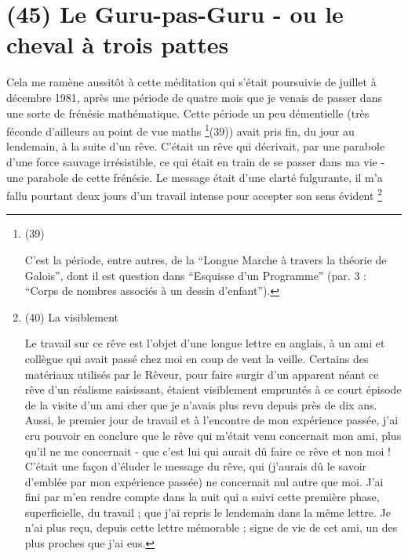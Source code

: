 \section{(45) Le Guru-pas-Guru - ou le cheval à trois pattes}

Cela me ramène aussitôt à cette méditation qui s'était poursuivie de juillet à décembre 1981, après une période de quatre mois que je venais de passer dans une sorte de frénésie mathématique. Cette période un peu démentielle (très féconde d'ailleurs au point de vue maths \footnote{(39) \par C'est la période, entre autres, de la ``Longue Marche à travers la théorie de Galois'', dont il est question dans ``Esquisse d'un Programme'' (par. 3 : ``Corps de nombres associés à un dessin d'enfant'').}(39)) avait pris fin, du jour au lendemain, à la suite d'un rêve. C'était un rêve qui décrivait, par une parabole d'une force sauvage irrésistible, ce qui était en train de se passer dans ma vie - une parabole de cette frénésie. Le message était d'une clarté fulgurante, il m'a fallu pourtant deux jours d'un travail intense pour accepter son sens évident \footnote{(40) La visiblement

Le travail sur ce rêve est l'objet d'une longue lettre en anglais, à un ami et collègue qui avait passé chez moi en coup de vent la veille. Certains des matériaux utilisés par le Rêveur, pour faire surgir d'un apparent néant ce rêve d'un réalisme saisissant, étaient visiblement empruntés à ce court épisode de la visite d'un ami cher que je n'avais plus revu depuis près de dix ans. Aussi, le premier jour de travail et à l'encontre de mon expérience passée, j'ai cru pouvoir en conclure que le rêve qui m'était venu concernait mon ami, plus qu'il ne me concernait - que c'est lui qui aurait dû faire ce rêve et non moi ! C'était une façon d'éluder le message du rêve, qui (j'aurais dû le savoir d'emblée par mon expérience passée) ne concernait nul autre que moi. J'ai fini par m'en rendre compte dans la nuit qui a suivi cette première phase, superficielle, du travail ; que j'ai repris le lendemain dans la même lettre. Je n'ai plus reçu, depuis cette lettre mémorable ; signe de vie de cet ami, un des plus proches que j'ai eus.

}
